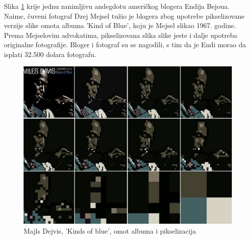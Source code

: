 \documentclass[a4paper]{article}
\begin{document}
Slika \ref{fig:miles} krije jednu zanimljivu andegdotu američkog blogera Endija Bejoua. Naime, čuveni fotograf Dzej Mejsel tužio je blogera zbog upotrebe pikselizovane verzije slike omota albuma 'Kind of Blue', koju je Mejsel slikao 1967. godine. Prema Mejselovim advokatima, pikselizovana slika slike jeste i dalje upotreba originalne fotografije. Bloger i fotograf su se nagodili, s tim da je Endi morao da isplati 32.500 dolara fotografu.\cite{pixel} \newline
\begin{figure}[h!]
\begin{center}
\includegraphics[scale=0.6]{miles.JPG}
\end{center}
\caption{Majls Dejvis, 'Kinds of blue', omot albuma i pikselizacija}
\label{fig:miles}
\end{figure}
\end{document}
